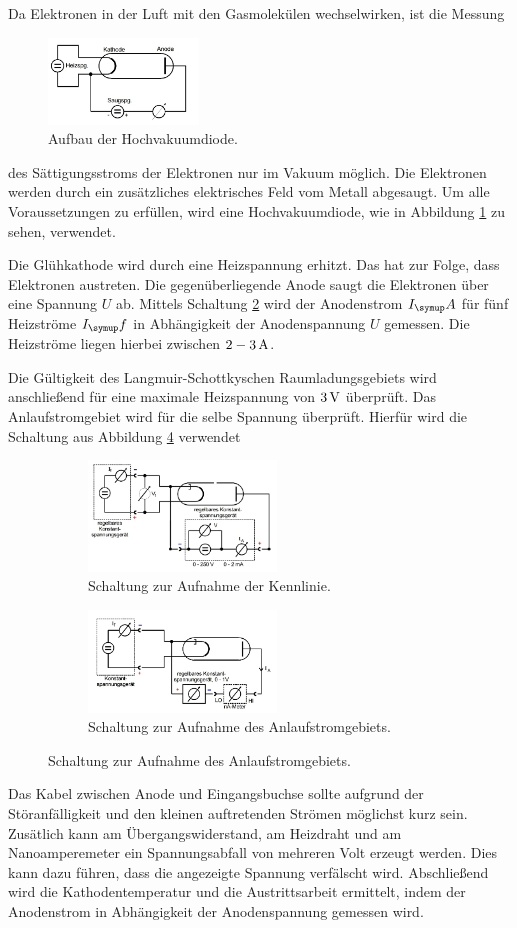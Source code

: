 Da Elektronen in der Luft mit den Gasmolekülen wechselwirken, ist die Messung
\begin{figure}
  \includegraphics[width=4cm]{bilder/aufbau.jpg}
  \caption{Aufbau der Hochvakuumdiode. \cite{504}}
  \label{aufbau}
\end{figure}
des Sättigungsstroms der Elektronen nur im Vakuum möglich.
Die Elektronen werden durch ein zusätzliches elektrisches Feld vom Metall abgesaugt.
Um alle Voraussetzungen zu erfüllen, wird eine Hochvakuumdiode, wie in
Abbildung \ref{aufbau} zu sehen, verwendet.

Die Glühkathode wird durch eine Heizspannung erhitzt. Das hat zur Folge, dass
Elektronen austreten. Die gegenüberliegende Anode saugt die Elektronen über eine
Spannung $U$ ab.
Mittels Schaltung \ref{schaltA} wird der Anodenstrom $I_\su{A}$ für fünf
Heizströme $I_\su{f}$ in Abhängigkeit der Anodenspannung $U$ gemessen. Die Heizströme
liegen hierbei zwischen $2-3\,\si{\ampere}$.

Die Gültigkeit des Langmuir-Schottkyschen Raumladungsgebiets wird anschließend
für eine maximale Heizspannung von $3\,\si{\volt}$ überprüft. Das Anlaufstromgebiet wird
für die selbe Spannung überprüft. Hierfür wird die Schaltung aus Abbildung \ref{schaltB}
verwendet
\begin{figure}
  \centering
  \begin{subfigure}{0.45\textwidth}
    \centering
    \includegraphics[width=5cm]{bilder/schaltA.jpg}
    \caption{Schaltung zur Aufnahme der Kennlinie. \cite{504}}
    \label{schaltA}
  \end{subfigure}
  \begin{subfigure}{0.45\textwidth}
    \centering
    \includegraphics[width=5cm]{bilder/schaltB.jpg}
    \caption{Schaltung zur Aufnahme des Anlaufstromgebiets. \cite{504}}
    \label{schaltB}
  \end{subfigure}
\end{figure}
Das Kabel zwischen Anode und Eingangsbuchse sollte aufgrund der Störanfälligkeit
und den kleinen auftretenden Strömen möglichst kurz sein. Zusätlich kann am
Übergangswiderstand, am Heizdraht und am Nanoamperemeter ein Spannungsabfall
von mehreren Volt erzeugt werden. Dies kann dazu führen, dass die angezeigte Spannung verfälscht
wird.
Abschließend wird die Kathodentemperatur und die Austrittsarbeit ermittelt,
indem der Anodenstrom in Abhängigkeit der Anodenspannung gemessen wird.
